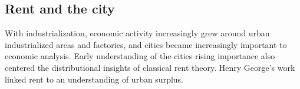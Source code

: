 
\subsection{Rent and the city} 
With industrialization, economic activity increasingly grew around urban industrialized areas and factories, %
and cities became increasingly important to economic analysis. Early understanding of the cities rising importance also centered the distributional insights of classical rent theory. %
Henry George's work linked rent to an understanding of urban surplus. %

